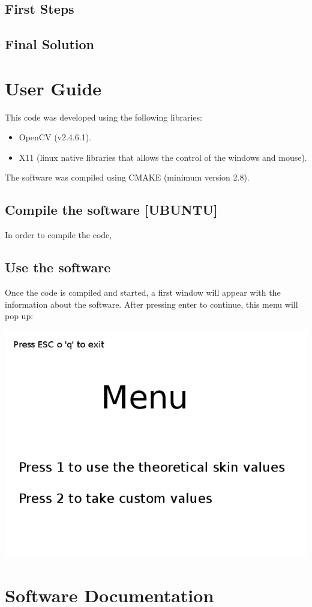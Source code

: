 \documentclass{article}
\begin{document}
\subsection{First Steps}

\subsection{Final Solution}

\section{User Guide}
This code was developed using the following libraries: 
\begin{itemize}
\item OpenCV (v2.4.6.1).
\item X11 (linux native libraries that allows the control of the windows and mouse). 
\end{itemize}
The software was compiled using CMAKE (minimum version 2.8).

\subsection{Compile the software [UBUNTU]}

In order to compile the code, 

\subsection{Use the software}
Once the code is compiled and started, a first window will appear with the information about the software. After pressing enter to continue, this menu will pop up: 
\begin{center}
\includegraphics[scale=0.5]{../../img/menu.png} 
\end{center}
\section{Software Documentation}
\end{document}
